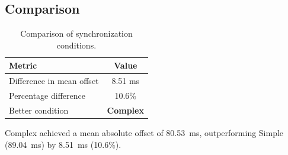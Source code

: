 \subsection*{Comparison}

\begin{table}[h!]
\centering
\begin{tabular}{|l|c|}
\hline
Metric & Value \\
\hline
Difference in mean offset & 8.51 ms \\
Percentage difference & 10.6\% \\
Better condition & \textbf{Complex} \\
\hline
\end{tabular}
\caption{Comparison of synchronization conditions.}
\label{tab:sync_comparison}
\end{table}

Complex achieved a mean absolute offset of 80.53~ms, outperforming Simple (89.04~ms) by 8.51~ms (10.6\%).
